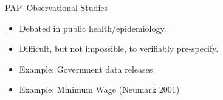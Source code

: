 \documentclass{beamer}
\begin{document}
{ %
    \begin{frame}[plain]
     \end{frame}
}
\begin{frame}{PAP--Observational Studies}
\begin{itemize}[<.->]
\item Debated in public health/epidemiology.
\item Difficult, but not impossible, to verifiably pre-specify.
\item Example: Government data releases
\item Example: Minimum Wage (Neumark 2001)
\end{itemize}
\end{frame}

{ %
    \begin{frame}[plain]
     \end{frame}
}
\end{document}
